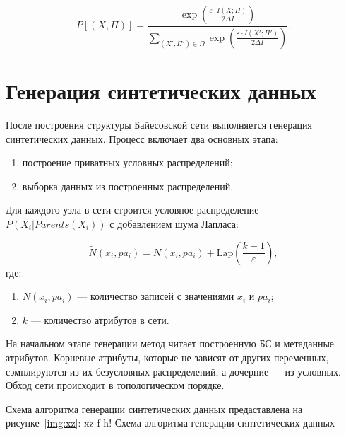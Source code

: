 \begin{equation}\label{eq:c}
    P[(X, \Pi)] = \frac{\exp\left(\frac{\varepsilon \cdot I(X; \Pi)}{2\Delta I}\right)}{\sum_{(X', \Pi') \in \Omega} \exp\left(\frac{\varepsilon \cdot I(X'; \Pi')}{2\Delta I}\right)}.
\end{equation}

\section{Генерация синтетических данных}

После построения структуры Байесовской сети выполняется генерация синтетических данных. Процесс включает два основных этапа:
\begin{enumerate}[label*=---]
	\item построение приватных условных распределений;
	\item выборка данных из построенных распределений.
\end{enumerate}


Для каждого узла в сети строится условное распределение $P(X_i | Parents(X_i))$ с добавлением шума Лапласа:

\begin{equation}
    \tilde{N}(x_i, pa_i) = N(x_i, pa_i) + \text{Lap}\left(\frac{k-1}{\varepsilon}\right),
\end{equation}
где:
\begin{enumerate}[label*=---]
	\item $N(x_i, pa_i)$ --- количество записей с значениями $x_i$ и $pa_i$;
	\item $k$ --- количество атрибутов в сети.
\end{enumerate}



На начальном этапе генерации метод читает построенную БС и метаданные атрибутов.
Корневые атрибуты, которые не зависят от других переменных, сэмплируются из их безусловных распределений, а дочерние --- из условных.
Обход сети происходит в топологическом порядке.

\newpage
Схема алгоритма генерации синтетических данных предаставлена на рисунке~\ref{img:xz}:
{xz} %
{f} %
{h!} %
{\textwidth} %
{Схема алгоритма генерации синтетических данных} %


